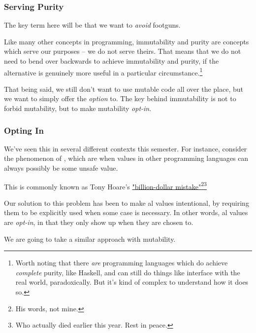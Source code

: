 \documentclass[aspectratio=169]{beamer}
\begin{document}
\begin{frame}[fragile]
  \frametitle{Serving Purity}

  The key term here will be that we want to \textit{avoid} footguns.

  \pause
  \vspace{\fill}

  Like many other concepts in programming, immutability and purity are concepts
  which serve our purposes -- we do not serve theirs. That means that we do
  not need to bend over backwards to achieve immutability and purity, if the
  alternative is genuinely more useful in a particular circumstance.\footnote{Worth
  noting that there \textit{are} programming languages which do achieve \textit{complete}
  purity, like Haskell, and can still do things like interface with the real world,
  paradoxically. But it's kind of complex to understand how it does so.}

  \pause
  \vspace{\fill}

  That being said, we still don't want to use mutable code all over the place, but
  we want to simply offer the \textit{option} to. The key behind immutability is
  not to forbid mutability, but to make mutability \textit{opt-in}.
\end{frame}

\begin{frame}[fragile]
  \frametitle{Opting In}

  We've seen this in several different contexts this semester. For instance, consider
  the phenomenon of , which are when values in other programming
  languages can always possibly be some unsafe  value.

  \pause
  \vspace{\fill}

  This is commonly known as Tony Hoare's
  {\color{blue}\href{https://www.infoq.com/presentations/Null-References-The-Billion-Dollar-Mistake-Tony-Hoare/}{"billion-dollar mistake"}}\footnote{His words, not mine.}\footnote{Who actually died earlier this year. Rest in peace.}

  \pause
  \vspace{\fill}

  Our solution to this problem has been to make al values intentional,
  by requiring them to be explicitly used when some  case is necessary.
  In other words, al values are \textit{opt-in}, in that they only
  show up when they are chosen to.

  \pause
  \vspace{\fill}

  We are going to take a similar approach with mutability.
\end{frame}
\end{document}
